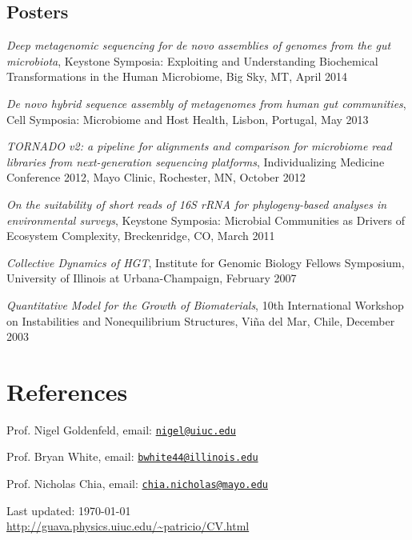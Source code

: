 \documentclass[letterpaper]{article}
\def\footerlink{http://guava.physics.uiuc.edu/~patricio/CV.html}
\renewenvironment{itemize}{
  \begin{list}{}{
    \setlength{\leftmargin}{1.5em}
  }
}{
  \end{list}
}
\begin{document}
\subsection*{Posters}
\begin{itemize}
  \item \textit{Deep metagenomic sequencing for de novo assemblies of genomes from the gut microbiota},
  Keystone Symposia: Exploiting and Understanding Biochemical Transformations in the Human Microbiome,
  Big Sky, MT, April 2014
  \item \textit{De novo hybrid sequence assembly of metagenomes from human gut communities},
  Cell Symposia: Microbiome and Host Health, Lisbon, Portugal, May 2013
  \item \textit{TORNADO v2: a pipeline for alignments and comparison for 
  microbiome read libraries from next-generation sequencing platforms},
  Individualizing Medicine Conference 2012, Mayo Clinic, Rochester, MN,
  October 2012
  \item \textit{On the suitability of short reads of 16S rRNA for
  phylogeny-based analyses in environmental surveys}, Keystone Symposia:
  Microbial Communities as Drivers of Ecosystem Complexity, Breckenridge, CO,
  March 2011
  \item \textit{Collective Dynamics of HGT}, Institute for Genomic Biology
  Fellows Symposium, University of Illinois at Urbana-Champaign, February 2007
  \item \textit{Quantitative Model for the Growth of Biomaterials}, 10th
  International Workshop on Instabilities and Non\-equilibrium Structures, Viña
  del Mar, Chile, December 2003
\end{itemize}

\section*{References}
\begin{itemize}
  \item Prof. Nigel Goldenfeld, email:
  \href{mailto:nigel@uiuc.edu}{\texttt {nigel@uiuc.edu}}
  \item Prof. Bryan White, email:
  \href{mailto:bwhite44@illinois.edu}{\texttt{bwhite44@illinois.edu}}
  \item Prof. Nicholas Chia, email:
  \href{mailto:chia.nicholas@mayo.edu}{\texttt{chia.nicholas@mayo.edu}}
\end{itemize}
 \bigskip

 \begin{center}
   \begin{footnotesize}
     Last updated: \today \\
     \href{\footerlink}{\url{\footerlink}}
   \end{footnotesize}
 \end{center}
\end{document}
